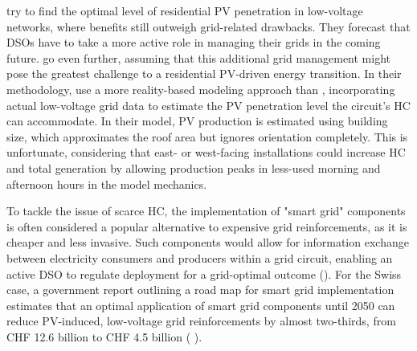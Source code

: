 \documentclass[12PT, ]{article}
\begin{document}
\cite{tevar2019} try to find the optimal level of residential PV penetration in low-voltage networks, where benefits still outweigh grid-related drawbacks. They forecast that DSOs have to take a more active role in managing their grids in the coming future. 
\cite{nguyen2016} go even further, assuming that this additional grid management might pose the greatest challenge to a residential PV-driven energy transition.
In their methodology, 
\cite{tevar2019} use a more reality-based modeling approach than \cite{bfe_ep2050_netz2022}, incorporating actual low-voltage grid data to estimate the PV penetration level the circuit's HC can accommodate. 
%
In their model, PV production is estimated using building size, which approximates the roof area but ignores orientation completely. 
This is unfortunate, considering that east- or west-facing installations could increase HC and total generation by allowing production peaks in less-used morning and afternoon hours in the model mechanics.


To tackle the issue of scarce HC, the implementation of "smart grid" components is often considered a popular alternative to expensive grid reinforcements, as it is cheaper and less invasive. 
Such components would allow for information exchange between electricity consumers and producers within a grid circuit, enabling an active DSO to regulate deployment for a grid-optimal outcome
(\cite{tevar2019}). %
For the Swiss case, a  government report outlining a road map for smart grid implementation estimates that an optimal application of smart grid components until 2050 can reduce PV-induced, low-voltage grid reinforcements by almost two-thirds, from CHF 12.6 billion to CHF 4.5 billion (\cite{consentc2012_in_smartgridroadmap}
\cite{bfe_smartgridroadmap2015}).
\end{document}
